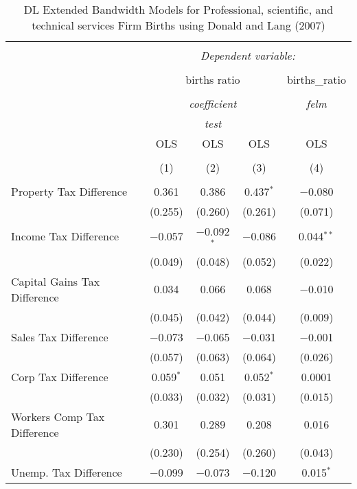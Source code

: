 
\begin{table}[!htbp] \centering 
  \caption{DL Extended Bandwidth Models for  Professional, scientific, and technical services Firm Births using Donald and Lang (2007)} 
  \label{} 
\begin{tabular}{@{\extracolsep{5pt}}lcccc} 
\\[-1.8ex]\hline 
\hline \\[-1.8ex] 
 & \multicolumn{4}{c}{\textit{Dependent variable:}} \\ 
\cline{2-5} 
\\[-1.8ex] & \multicolumn{3}{c}{births ratio} & births\_ratio \\ 
\\[-1.8ex] & \multicolumn{3}{c}{\textit{coefficient}} & \textit{felm} \\ 
 & \multicolumn{3}{c}{\textit{test}} & \textit{} \\ 
 & OLS & OLS & OLS & OLS \\ 
\\[-1.8ex] & (1) & (2) & (3) & (4)\\ 
\hline \\[-1.8ex] 
 Property Tax Difference & 0.361 & 0.386 & 0.437$^{*}$ & $-$0.080 \\ 
  & (0.255) & (0.260) & (0.261) & (0.071) \\ 
  Income Tax Difference & $-$0.057 & $-$0.092$^{*}$ & $-$0.086 & 0.044$^{**}$ \\ 
  & (0.049) & (0.048) & (0.052) & (0.022) \\ 
  Capital Gains Tax Difference & 0.034 & 0.066 & 0.068 & $-$0.010 \\ 
  & (0.045) & (0.042) & (0.044) & (0.009) \\ 
  Sales Tax Difference & $-$0.073 & $-$0.065 & $-$0.031 & $-$0.001 \\ 
  & (0.057) & (0.063) & (0.064) & (0.026) \\ 
  Corp Tax Difference & 0.059$^{*}$ & 0.051 & 0.052$^{*}$ & 0.0001 \\ 
  & (0.033) & (0.032) & (0.031) & (0.015) \\ 
  Workers Comp Tax Difference & 0.301 & 0.289 & 0.208 & 0.016 \\ 
  & (0.230) & (0.254) & (0.260) & (0.043) \\ 
  Unemp. Tax Difference & $-$0.099 & $-$0.073 & $-$0.120 & 0.015$^{*}$ \\ 

\end{tabular}
\end{table}
